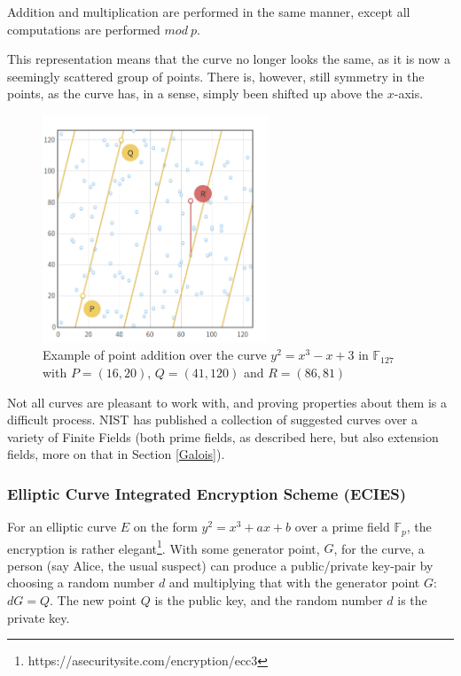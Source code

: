 Addition and multiplication are performed in the same manner, except all computations are performed $mod~p$.

This representation means that the curve no longer looks the same, as it is now a seemingly scattered group of points. There is, however, still symmetry in the points, as the curve has, in a sense, simply been shifted up above the $x$-axis. 

\begin{figure}[H]
    \centering
    \includegraphics[width=0.6\textwidth]{figures/ECC-finite-field}
    \caption{Example of point addition over the curve $y^2 = x^3-x+3$ in $\mathbb{F}_{127}$ with $P = (16, 20)$, $Q = (41, 120)$ and $R = (86, 81)$}
\end{figure}

Not all curves are pleasant to work with, and proving properties about them is a difficult process. NIST has published a collection of suggested curves over a variety of Finite Fields (both prime fields, as described here, but also extension fields, more on that in Section \ref{Galois}).
\subsubsection{Elliptic Curve Integrated Encryption Scheme (ECIES)}
For an elliptic curve $E$ on the form $y^2=x^3+ax+b$ over a prime field $\mathbb{F}_p$, the encryption is rather elegant\footnote{https://asecuritysite.com/encryption/ecc3}. With some generator point, $G$, for the curve, a person (say Alice, the usual suspect) can produce a public/private key-pair by choosing a random number $d$ and multiplying that with the generator point $G$: $dG=Q$. The new point $Q$ is the public key, and the random number $d$ is the private key. 


